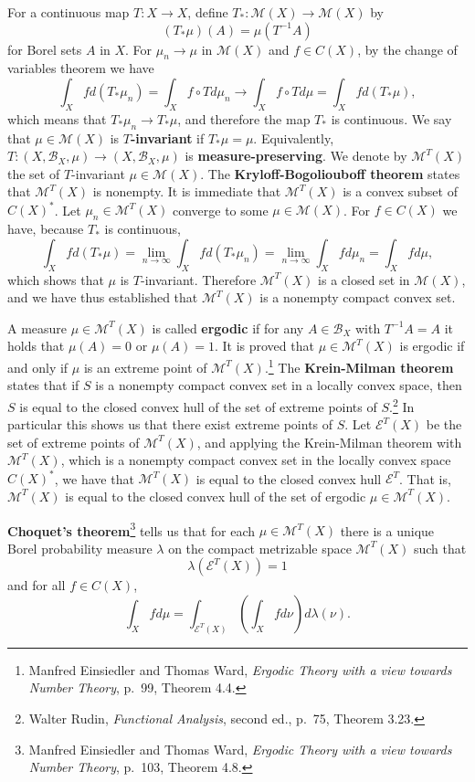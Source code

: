 \documentclass{article}
\theoremstyle{definition}
\begin{document}
For a continuous map $T:X \to X$, define $T_*:\mathscr{M}(X) \to \mathscr{M}(X)$
by
\[
(T_*\mu)(A) = \mu(T^{-1}A)
\]
for  Borel sets $A$ in $X$. 
 For $\mu_n \to \mu$ in $\mathscr{M}(X)$ and $f \in C(X)$, by the change of variables theorem we have
\[
\int_X f d(T_*\mu_n) = \int_X f \circ T d\mu_n \to \int_X f \circ T d\mu = \int_X f d(T_*\mu),
\]
which means that $T_*\mu_n \to T_*\mu$, and therefore the map $T_*$ is continuous.
We say that $\mu \in \mathscr{M}(X)$ is \textbf{$T$-invariant} if $T_*\mu = \mu$. Equivalently,
$T:(X,\mathscr{B}_X,\mu) \to (X,\mathscr{B}_X,\mu)$ is \textbf{measure-preserving}.
We denote by $\mathscr{M}^T(X)$ the set of $T$-invariant $\mu \in \mathscr{M}(X)$. 
The \textbf{Kryloff-Bogoliouboff theorem} states that $\mathscr{M}^T(X)$ is nonempty. It is immediate that $\mathscr{M}^T(X)$
is a convex subset of $C(X)^*$. Let $\mu_n \in \mathscr{M}^T(X)$ converge to some $\mu \in \mathscr{M}(X)$.
For $f \in C(X)$ we have,  because $T_*$ is continuous,
\[
\int_X f d(T_*\mu) = \lim_{n \to \infty} \int_X f d(T_* \mu_n) = \lim_{n \to \infty} \int_X f d\mu_n
= \int_X f d\mu,
\]
which shows that $\mu$ is $T$-invariant. Therefore $\mathscr{M}^T(X)$ is a closed set in
$\mathscr{M}(X)$, and we have thus established that $\mathscr{M}^T(X)$ is a nonempty compact convex set. 

A measure $\mu \in \mathscr{M}^T(X)$ is called \textbf{ergodic} if for
any $A \in \mathscr{B}_X$ with $T^{-1}A=A$ it holds that $\mu(A)=0$ or $\mu(A)=1$.
It is proved that $\mu \in \mathscr{M}^T(X)$ is ergodic if and only if $\mu$ is an extreme point
of $\mathscr{M}^T(X)$.\footnote{Manfred Einsiedler and Thomas Ward, {\em Ergodic Theory with a view towards Number Theory},
p.~99, Theorem 4.4.}
The \textbf{Krein-Milman theorem} states that if $S$ is a nonempty compact convex set in a locally
convex space, then $S$ is equal to the closed convex hull of the set of extreme  points of $S$.\footnote{Walter Rudin, {\em Functional Analysis},
second ed., p.~75, Theorem 3.23.} 
In particular this shows us that there exist extreme points of $S$.
Let $\mathscr{E}^T(X)$ be the set of extreme points of $\mathscr{M}^T(X)$, and
applying the Krein-Milman theorem with $\mathscr{M}^T(X)$, which is a nonempty compact convex set in the locally
convex space $C(X)^*$,
we have that $\mathscr{M}^T(X)$ is equal to the closed convex hull $\mathscr{E}^T$.
That is, $\mathscr{M}^T(X)$ is equal to the closed convex hull of the set of ergodic $\mu \in \mathscr{M}^T(X)$. 

\textbf{Choquet's theorem}\footnote{Manfred Einsiedler and Thomas Ward, {\em Ergodic Theory with a view towards Number Theory},
p.~103, Theorem 4.8.} tells us that for each $\mu \in \mathscr{M}^T(X)$ there is a unique 
Borel probability measure $\lambda$ on the compact metrizable space $\mathscr{M}^T(X)$ such that
\[
\lambda(\mathscr{E}^T(X))=1
\]
and for all $f \in C(X)$,
\[
\int_X f d\mu = \int_{\mathscr{E}^T(X)} \left( \int_X f d\nu \right) d\lambda(\nu).
\]
\end{document}
